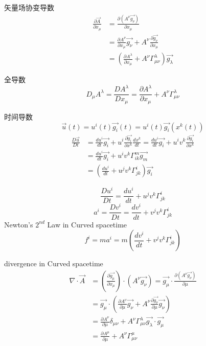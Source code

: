 \documentclass[12pt, a4paper, oneside, UTF8]{ctexbook}  %
\newcommand{\pa}{\partial}
\begin{document}
\begin{defn}
    矢量场协变导数
    \begin{align*}
        \frac{\pa\vec{A}}{\pa x_\mu}&=\frac{\pa \left(A^\nu\vec{g_\nu}\right)}{\pa x_\mu}\\
        &=\frac{\pa A^\nu}{\pa x_\mu}\vec{g_\nu}+A^\nu\frac{\pa \vec{g_\nu}}{\pa x_\mu}\\
        &=\left(\frac{\pa A^\lambda}{\pa x_\mu}+A^\nu\Gamma^\lambda_{\mu\nu}\right)\vec{g_\lambda}
    \end{align*}
\end{defn}
\begin{corollary}
    全导数
    \[
    D_\mu A^\lambda=\frac{D A^\lambda}{Dx_\mu}
    =\frac{\pa A^\lambda}{\pa x_\mu}+A^\nu\Gamma^\lambda_{\mu\nu}
    \]
\end{corollary}
\begin{defn}
    时间导数
    \[\vec{u}(t)=u^i(t)\vec{g_i}(t)=u^i(t)\vec{g_i}(x^k(t))\]
    \begin{align*}
        \frac{D\vec{u}}{Dt}&=\frac{du^i}{dt}\vec{g_i}
        +u^i\frac{\pa\vec{g_i}}{\pa x^k}\frac{dx^k}{dt}
        =\frac{du^i}{dt}\vec{g_i}
        +u^iv^k\frac{\pa\vec{g_i}}{\pa x^k}\\
        &=\frac{du^i}{dt}\vec{g_i}
        +u^iv^k\Gamma^m_{ik}\vec{g_m}\\
        &=\left(\frac{du^i}{dt}+u^jv^k\Gamma^i_{jk}\right)\vec{g_i}
    \end{align*}
\end{defn}
\begin{corollary}
    \[
        \frac{Du^i}{Dt}=\frac{du^i}{dt}+u^jv^k\Gamma^i_{jk}
    \]\[
    a^i=\frac{Dv^i}{Dt}=\frac{dv^i}{dt}+v^jv^k\Gamma^i_{jk}
    \]
    Newton's $2^{nd}$ Law in Curved spacetime
    \[
    f^i=ma^i=m\left(\frac{dv^i}{dt}+v^jv^k\Gamma^i_{jk}\right)
    \]
\end{corollary}
\begin{defn}
    divergence in Curved spacetime
    \begin{align*}
        \nabla\cdot\vec{A}&=\left(\frac{\pa \vec{g_\mu}}{\pa x_\mu}\right)
        \cdot\left(A^\nu\vec{g_\nu}\right)
        =\vec{g_\mu}\cdot\frac{\pa\left(A^\nu\vec{g_\nu}\right)}{\pa \mu}\\
        &=\vec{g_\mu}\cdot\left(\frac{\pa A^\nu}{\pa\mu}\vec{g_\nu}+
        A^\nu\frac{\pa\vec{g_\nu}}{\pa \mu}\vec{g_\nu}\right)\\
        &=\frac{\pa A^\nu}{\pa\mu}\delta_{\mu\nu}+A^\nu\Gamma^\lambda_{\mu\nu}\vec{g_\lambda}\cdot\vec{g_\mu}\\
        &=\frac{\pa A^\mu}{\pa\mu}+A^\nu\Gamma^\mu_{\mu\nu}
    \end{align*}
\end{defn}
\end{document}
